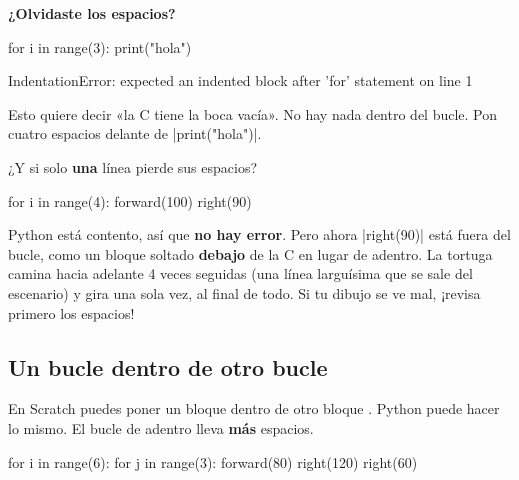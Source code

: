 \textbf{¿Olvidaste los espacios?}

\begin{codenonum}
for i in range(3):
print("hola")
\end{codenonum}
\begin{errorbox}
IndentationError: expected an indented block after 'for' statement on line 1
\end{errorbox}

Esto quiere decir «la C tiene la boca vacía». No hay nada dentro del bucle. Pon cuatro espacios delante de \py|print("hola")|.

\begin{watchout}
¿Y si solo \textbf{una} línea pierde sus espacios?
\begin{codenonum}
for i in range(4):
    forward(100)
right(90)
\end{codenonum}
Python está contento, así que \textbf{no hay error}. Pero ahora \py|right(90)| está fuera del bucle, como un bloque soltado \textbf{debajo} de la C en lugar de adentro. La tortuga camina hacia adelante 4 veces seguidas (una línea larguísima que se sale del escenario) y gira una sola vez, al final de todo. Si tu dibujo se ve mal, ¡revisa primero los espacios!
\end{watchout}

\subsection*{Un bucle dentro de otro bucle}

En Scratch puedes poner un bloque  dentro de otro bloque . Python puede hacer lo mismo. El bucle de adentro lleva \textbf{más} espacios.

\begin{tcbraster}[raster columns=2, raster equal height=rows, raster column skip=12pt, raster valign=center]
\begin{tcolorbox}[colback=white, colframe=white, boxrule=0pt, valign=center]
\begin{scratch}[scale=0.85]
\end{scratch}
\end{tcolorbox}
\begin{spaces}
for i in range(6):
    for j in range(3):
        forward(80)
        right(120)
    right(60)
\end{spaces}
\end{tcbraster}


